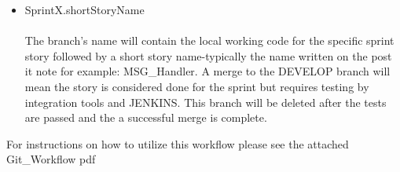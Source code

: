 \begin{itemize}
\item SprintX.shortStoryName\\ \\
The branch's name will contain the local working code for the specific sprint story followed by a short story name-typically the name written on the post it note for example: MSG\_Handler. A merge to the DEVELOP branch will mean the story is considered done for the sprint but requires testing by integration tools and JENKINS. This branch will be deleted after the tests are passed and the a successful merge is complete.
\end{itemize}

For instructions on how to utilize this workflow please see the attached Git\_Workflow pdf